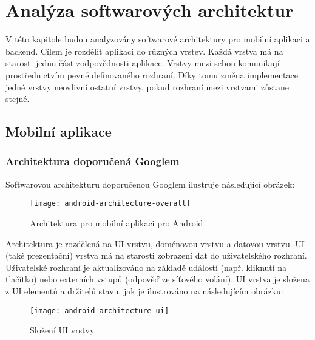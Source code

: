\chapter{Analýza softwarových architektur}
\setcounter{page}{1}

V této kapitole budou analyzovány softwarové architektury pro mobilní aplikaci a backend. Cílem je rozdělit aplikaci do různých vrstev. Každá vrstva má na starosti jednu část zodpovědnosti aplikace. Vrstvy mezi sebou komunikují prostřednictvím pevně definovaného rozhraní. Díky tomu změna implementace jedné vrstvy neovlivní ostatní vrstvy, pokud rozhraní mezi vrstvami zůstane stejné.

\section{Mobilní aplikace}

\subsection{Architektura doporučená Googlem}
Softwarovou architekturu doporučenou Googlem \cite{android-architecture} ilustruje následující obrázek:

\begin{figure}[h!]
	\centering
	
	\texttt{[image: android-architecture-overall]}
	
	\caption{Architektura pro mobilní aplikaci pro Android \cite{android-architecture}}
	\label{fig:android-architecture-overall}
\end{figure}

\noindent Architektura je rozdělená na UI vrstvu, doménovou vrstvu a datovou vrstvu. UI (také prezentační) vrstva má na starosti zobrazení dat do uživatelského rozhraní. Uživatelské rozhraní je aktualizováno na základě událostí (např. kliknutí na tlačítko) nebo externích vstupů (odpověď ze síťového volání). UI vrstva je složena z UI elementů a držitelů stavu, jak je ilustrováno na následujícím obrázku:

\begin{figure}[H]
	\centering
	
	\texttt{[image: android-architecture-ui]}
	
	\caption{Složení UI vrstvy \cite{android-architecture}}
	\label{fig:android-architecture-ui}
\end{figure}

